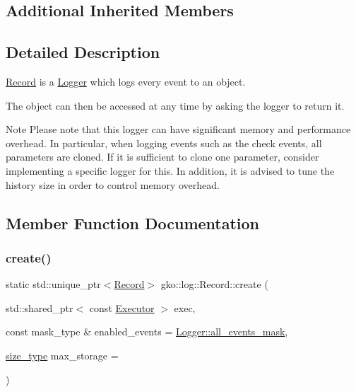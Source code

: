 \subsection*{Additional Inherited Members}


\subsection{Detailed Description}
\hyperlink{classgko_1_1log_1_1Record}{Record} is a \hyperlink{classgko_1_1log_1_1Logger}{Logger} which logs every event to an object. 

The object can then be accessed at any time by asking the logger to return it.

\begin{DoxyNote}{Note}
Please note that this logger can have significant memory and performance overhead. In particular, when logging events such as the {\ttfamily check} events, all parameters are cloned. If it is sufficient to clone one parameter, consider implementing a specific logger for this. In addition, it is advised to tune the history size in order to control memory overhead. 
\end{DoxyNote}


\subsection{Member Function Documentation}
\mbox{\label{classgko_1_1log_1_1Record_ab3863ff409b8ceaefa2f226a4e26debc}} 
\subsubsection{\texorpdfstring{create()}{create()}}
{\footnotesize\ttfamily static std\+::unique\+\_\+ptr$<$\hyperlink{classgko_1_1log_1_1Record}{Record}$>$ gko\+::log\+::\+Record\+::create (\begin{DoxyParamCaption}\item[{std\+::shared\+\_\+ptr$<$ const \hyperlink{classgko_1_1Executor}{Executor} $>$}]{exec,  }\item[{const mask\+\_\+type \&}]{enabled\+\_\+events = {\ttfamily \hyperlink{classgko_1_1log_1_1Logger_a02534863a2d2f92dfeb2c39038365532}{Logger\+::all\+\_\+events\+\_\+mask}},  }\item[{\hyperlink{namespacegko_a6e5c95df0ae4e47aab2f604a22d98ee7}{size\+\_\+type}}]{max\+\_\+storage = {} }\end{DoxyParamCaption})\hspace{0.3cm}{\ttfamily [static]}}



